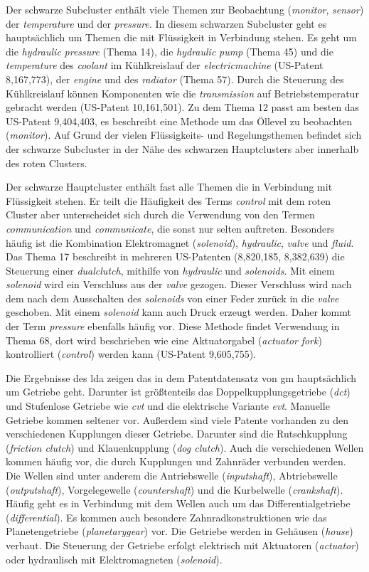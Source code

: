 Der schwarze Subcluster enthält viele Themen zur Beobachtung (\emph{monitor}, \emph{sensor}) der \emph{temperature} und der \emph{pressure}. In diesem schwarzen Subcluster geht es hauptsächlich um Themen die mit Flüssigkeit in Verbindung stehen. Es geht um die \emph{hydraulic} \emph{pressure} (Thema 14), die \emph{hydraulic} \emph{pump} (Thema 45) und die \emph{temperature} des \emph{coolant} im Kühlkreislauf der \emph{electricmachine} (US-Patent 8,167,773), der \emph{engine} und des \emph{radiator} (Thema 57). Durch die Steuerung des Kühlkreislauf können Komponenten wie die \emph{transmission} auf Betriebstemperatur gebracht werden (US-Patent 10,161,501). Zu dem Thema 12 passt am besten das US-Patent 9,404,403, es beschreibt eine Methode um das Öllevel zu beobachten (\emph{monitor}). Auf Grund der vielen Flüssigkeits- und Regelungsthemen befindet sich der schwarze Subcluster in der Nähe des schwarzen Hauptclusters aber innerhalb des roten Clusters.


Der schwarze Hauptcluster enthält fast alle Themen die in Verbindung mit Flüssigkeit stehen. Er teilt die Häufigkeit des Terms \emph{control} mit dem roten Cluster aber unterscheidet sich durch die Verwendung von den Termen \emph{communication} und \emph{communicate}, die sonst nur selten auftreten. Besonders häufig ist die Kombination Elektromagnet (\emph{solenoid}), \emph{hydraulic}, \emph{valve} und \emph{fluid}. Das Thema 17 beschreibt in mehreren US-Patenten (8,820,185, 8,382,639) die Steuerung einer \emph{dualclutch}, mithilfe von \emph{hydraulic} und \emph{solenoids}. Mit einem \emph{solenoid} wird ein Verschluss aus der \emph{valve} gezogen. Dieser Verschluss wird nach dem nach dem Ausschalten des \emph{solenoids} von einer Feder zurück in die \emph{valve} geschoben. Mit einem \emph{solenoid} kann auch Druck erzeugt werden. Daher kommt der Term \emph{pressure} ebenfalls häufig vor. Diese Methode findet Verwendung in Thema 68, dort wird beschrieben wie eine Aktuatorgabel (\emph{actuator} \emph{fork}) kontrolliert (\emph{control}) werden kann (US-Patent 9,605,755).
 
 
 Die Ergebnisse des \gls{lda} zeigen das in dem Patentdatensatz von \gls{gm} hauptsächlich um Getriebe geht. Darunter ist größtenteils das Doppelkupplungsgetriebe (\emph{\gls{dct}}) und Stufenlose Getriebe wie \emph{\gls{cvt}} und die elektrische Variante \emph{\gls{evt}}. Manuelle Getriebe kommen seltener vor. Außerdem sind viele Patente vorhanden zu den verschiedenen Kupplungen dieser Getriebe. Darunter sind die Rutschkupplung (\emph{friction clutch}) und Klauenkupplung (\emph{dog clutch}). Auch die verschiedenen Wellen kommen häufig vor, die durch Kupplungen und Zahnräder verbunden werden. Die Wellen sind unter anderem die Antriebswelle (\emph{inputshaft}), Abtriebswelle (\emph{outputshaft}), Vorgelegewelle (\emph{countershaft}) und die Kurbelwelle (\emph{crankshaft}). Häufig geht es in Verbindung mit dem Wellen auch um das Differentialgetriebe (\emph{differential}). Es kommen auch besondere Zahnradkonstruktionen wie das Planetengetriebe (\emph{planetarygear}) vor. Die Getriebe werden in Gehäusen (\emph{house}) verbaut. Die Steuerung der Getriebe erfolgt elektrisch mit Aktuatoren (\emph{actuator}) oder hydraulisch mit Elektromagneten (\emph{solenoid}).
 


